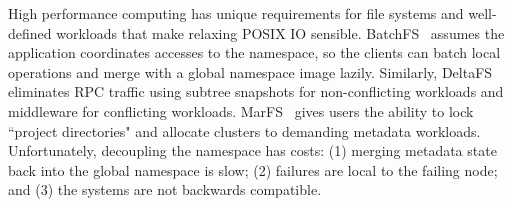 
High performance computing has unique requirements for file systems and
well-defined workloads that make relaxing POSIX IO sensible.
BatchFS~\cite{zheng:pdsw2014-batchfs} assumes the application coordinates
accesses to the namespace, so the clients can batch local operations and merge
with a global namespace image lazily. Similarly,
DeltaFS~\cite{zheng:pdsw2015-deltafs} eliminates RPC traffic using subtree
snapshots for non-conflicting workloads and middleware for conflicting
workloads. MarFS~\cite{grider:pdsw2015-marfs} gives users the ability to lock
``project directories" and allocate clusters to demanding metadata
workloads.  Unfortunately, decoupling the namespace has costs: (1) merging
metadata state back into the global namespace is slow; (2) failures are local
to the failing node; and (3) the systems are not backwards compatible.



